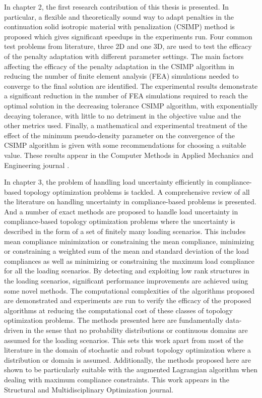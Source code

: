 In chapter 2, the first research contribution of this thesis is presented. In particular, a flexible and theoretically sound way to adapt penalties in the continuation solid isotropic material with penalization (CSIMP) method is proposed which gives significant speedups in the experiments run. Four common test problems from literature, three 2D and one 3D, are used to test the efficacy of the penalty adaptation with different parameter settings. The main factors affecting the efficacy of the penalty adaptation in the CSIMP algorithm in reducing the number of finite element analysis (FEA) simulations needed to converge to the final solution are identified. The experimental results demonstrate a significant reduction in the number of FEA simulations required to reach the optimal solution in the decreasing tolerance CSIMP algorithm, with exponentially decaying tolerance, with little to no detriment in the objective value and the other metrics used. Finally, a mathematical and experimental treatment of the effect of the minimum pseudo-density parameter on the convergence of the CSIMP algorithm is given with some recommendations for choosing a suitable value. These results appear in the Computer Methods in Applied Mechanics and Engineering journal \citep{TAREK2020112880}.

In chapter 3, the problem of handling load uncertainty efficiently in compliance-based topology optimization problems is tackled. A comprehensive review of all the literature on handling uncertainty in compliance-based problems is presented. And a number of exact methods are proposed to handle load uncertainty in compliance-based topology optimization problems where the uncertainty is described in the form of a set of finitely many loading scenarios. This includes mean compliance minimization or constraining the mean compliance, minimizing or constraining a weighted sum of the mean and standard deviation of the load compliances as well as minimizing or constraining the maximum load compliance for all the loading scenarios. By detecting and exploiting low rank structures in the loading scenarios, significant performance improvements are achieved using some novel methods. The computational complexities of the algorithms proposed are demonstrated and experiments are run to verify the efficacy of the proposed algorithms at reducing the computational cost of these classes of topology optimization problems. The methods presented here are fundamentally data-driven in the sense that no probability distributions or continuous domains are assumed for the loading scenarios. This sets this work apart from most of the literature in the domain of stochastic and robust topology optimization where a distribution or domain is assumed. Additionally, the methods proposed here are shown to be particularly suitable with the augmented Lagrangian algorithm when dealing with maximum compliance constraints. This work appears in the Structural and Multidisciplinary Optimization journal.


